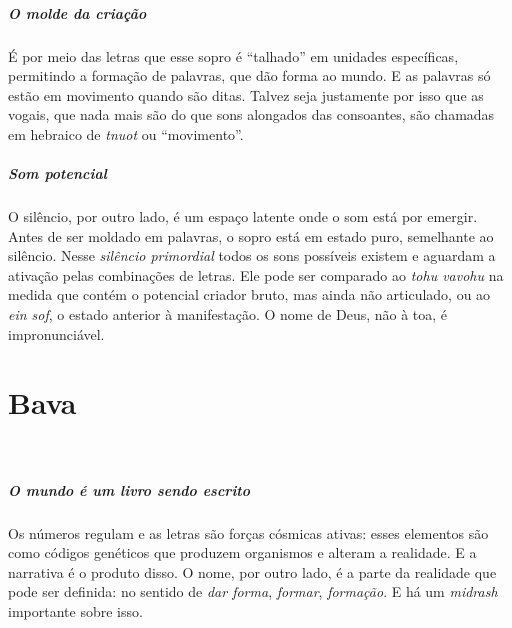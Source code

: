 \paragraph{O molde da criação} É por meio das letras que esse sopro é ``talhado'' em unidades específicas, permitindo a formação de palavras, que dão forma ao mundo. E as palavras só estão em movimento quando são ditas. Talvez seja justamente por isso que as vogais, que nada mais são do que sons alongados das consoantes, são chamadas em hebraico de \textit{tnuot} ou ``movimento''.

\paragraph{Som potencial} O silêncio, por outro lado, é um espaço latente onde o som está por emergir. Antes de ser moldado em palavras, o sopro está em estado puro, semelhante ao silêncio. Nesse \textit{silêncio primordial} todos os sons possíveis existem e aguardam a ativação pelas combinações de letras. Ele pode ser comparado ao \textit{tohu vavohu} na medida que contém o potencial criador bruto, mas ainda não articulado, ou ao \textit{ein sof}, o estado anterior à manifestação. O nome de Deus, não à toa, é impronunciável.

\chapter*{Bava 
\smallskip{}}

\begin{center}
{\huge{}}\\\medskip{\footnotesize\formularlight{
\lipsum[2]
}}
\end{center}

\paragraph{O mundo é um livro sendo escrito} Os números regulam e as letras são forças cósmicas ativas: esses elementos são como códigos genéticos que produzem organismos e alteram a realidade. E a narrativa é o produto disso. O nome, por outro lado, é a parte da realidade que pode ser definida: no sentido de \textit{dar forma}, \textit{formar}, \textit{formação}. E há um \textit{midrash} importante sobre isso.

